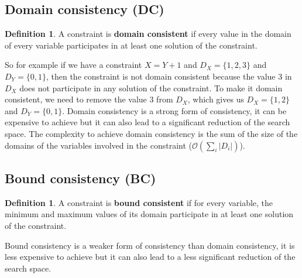 \documentclass[12pt, openany]{report}
\theoremstyle{definition}
\newtheorem{definition}[thm]{Definition}
\begin{document}
\subsection{Domain consistency (DC)}
\begin{definition}
    A constraint is \textbf{domain consistent} if every value in the domain of every variable participates in at least one solution of the constraint.
\end{definition}
So for example if we have a constraint $X = Y + 1$ and $D_X = \{1,2,3\}$ and $D_Y = \{0,1\}$, then the constraint is not domain consistent because the value 3 in $D_X$ does not participate in any solution of the constraint. To make it domain consistent, we need to remove the value 3 from $D_X$, which gives us $D_X = \{1,2\}$ and $D_Y = \{0,1\}$. Domain consistency is a strong form of consistency, it can be expensive to achieve but it can also lead to a significant reduction of the search space. The complexity to achieve domain consistency is the sum of the size of the domains of the variables involved in the constraint ($\mathcal{O} (\sum_{i} |D_i|)$). 
\subsection{Bound consistency (BC)}
\begin{definition}
    A constraint is \textbf{bound consistent} if for every variable, the minimum and maximum values of its domain participate in at least one solution of the constraint.
\end{definition}
Bound consistency is a weaker form of consistency than domain consistency, it is less expensive to achieve but it can also lead to a less significant reduction of the search space. 
\end{document}
